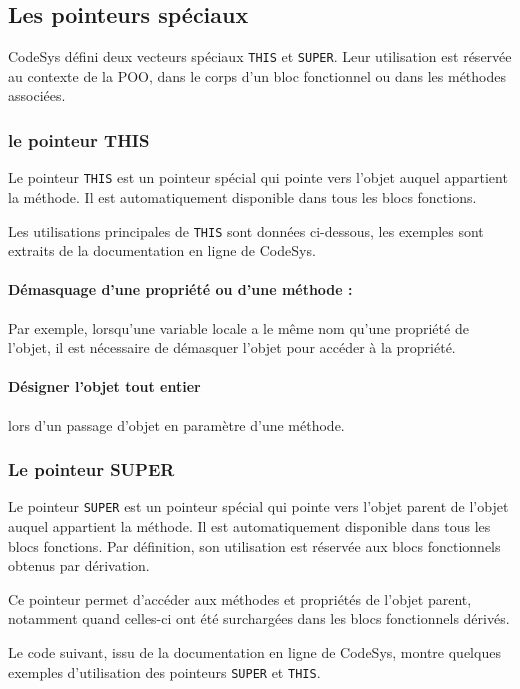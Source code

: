 \subsection{Les pointeurs spéciaux}
\label{subsec:pointeurs_speciaux}
CodeSys défini deux vecteurs spéciaux \lstinline{THIS} et \lstinline{SUPER}. Leur utilisation est réservée au contexte de la POO, dans le corps d'un bloc fonctionnel ou dans les méthodes associées.
\subsubsection{le pointeur THIS} 

Le pointeur \lstinline{THIS} est un pointeur spécial qui pointe vers l'objet auquel appartient la méthode. Il est automatiquement disponible dans tous les blocs fonctions. 

Les utilisations principales de \lstinline{THIS} sont données ci-dessous, les exemples sont extraits de la documentation en ligne de CodeSys. 

\paragraph{Démasquage d'une propriété ou d'une méthode : } Par exemple, lorsqu'une variable locale a le même nom qu'une propriété de l'objet, il est nécessaire de démasquer l'objet pour accéder à la propriété.  



\paragraph{Désigner l'objet tout entier} lors d'un passage d'objet en paramètre d'une méthode.



\subsubsection{Le pointeur SUPER}
Le pointeur \lstinline{SUPER} est un pointeur spécial qui pointe vers l'objet parent de l'objet auquel appartient la méthode. Il est automatiquement disponible dans tous les blocs fonctions. Par définition, son utilisation est réservée aux blocs fonctionnels obtenus par dérivation. 

Ce pointeur permet d'accéder aux méthodes et propriétés de l'objet parent, notamment quand celles-ci ont été surchargées dans les blocs fonctionnels dérivés. 

Le code suivant, issu de la documentation en ligne de CodeSys, montre quelques exemples d'utilisation des pointeurs \lstinline{SUPER} et \lstinline{THIS}.

